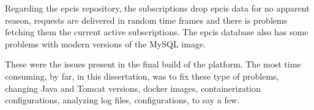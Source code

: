 Regarding the \ac{epcis} repository, the subscriptions drop \ac{epcis} data for no apparent reason, requests are delivered in random time frames and there is problems fetching them the current active subscriptions. The \ac{epcis} database also has some problems with modern versions of the MySQL image.

These were the issues present in the final build of the platform. The most time consuming, by far, in this dissertation, was to fix these type of problems, changing Java and Tomcat versions, docker images, containerization configurations, analyzing log files, configurations, to say a few.